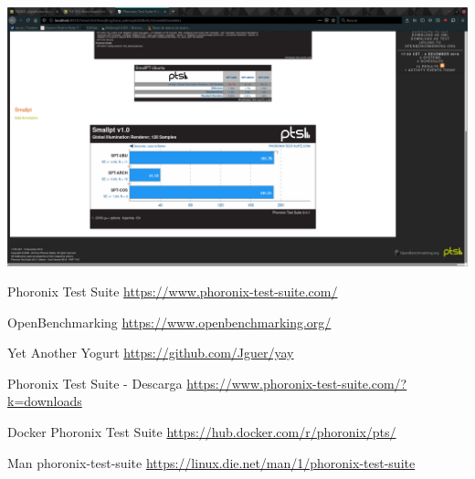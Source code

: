 \documentclass[12pt, spanish]{article}
\begin{document}
\begin{center}
\includegraphics[scale=0.25]{phoromatic_graph.png}
\end{center}







\newpage

\begin{thebibliography}{9}

Phoronix Test Suite \url{https://www.phoronix-test-suite.com/}

OpenBenchmarking \url{https://www.openbenchmarking.org/}

Yet Another Yogurt \url{https://github.com/Jguer/yay}

Phoronix Test Suite - Descarga \url{https://www.phoronix-test-suite.com/?k=downloads}

Docker Phoronix Test Suite \url{https://hub.docker.com/r/phoronix/pts/}

Man phoronix-test-suite \url{https://linux.die.net/man/1/phoronix-test-suite}

\end{thebibliography}
\end{document}
